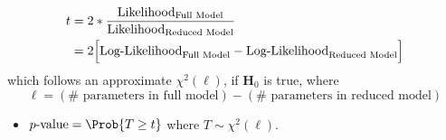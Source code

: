 \begin{itemize}
            \begin{align*}
                  t & =2\log*{\frac{\text{Likelihood}_{\text{Full Model}}}{\text{Likelihood}_{\text{Reduced Model}}}}      \\
                    & =2\Bigl[\text{Log-Likelihood}_{\text{Full Model}}-\text{Log-Likelihood}_{\text{Reduced Model}}\Bigr]
            \end{align*}
            which follows an approximate $ \chi^2(\ell) $, if $ \mathbf{H}_0 $ is true, where
            \[ \ell=(\#\text{ parameters in full model})-(\#\text{ parameters in reduced model}) \]
            \begin{itemize}
                  \item $ p\text{-value}=\Prob{T\ge t} $ where $ T \sim \chi^2(\ell) $.
            \end{itemize}
\end{itemize}
